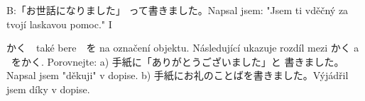 B:「お世話になりました」 って書きました。Napsal jsem: "Jsem ti vděčný za tvojí laskavou pomoc."
I

かく　také bere　を na označení objektu. Následující ukazuje rozdíl mezi  かく a ~をかく.
Porovnejte:
a) 手紙に「ありがとうございました」と 書きました。Napsal jsem "děkuji" v dopise.
b) 手紙にお礼のことばを書きました。Výjádřil jsem díky v dopise.
























